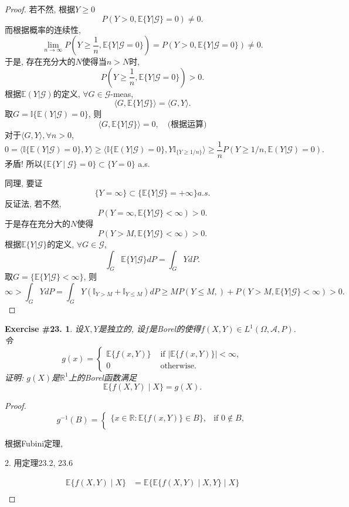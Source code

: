 \documentclass[UTF8, a4paper]{article}
\newtheorem{exercise}{Exercise \#23.}
\begin{document}
\begin{proof}
若不然, 根据\(Y \geq 0\)
$$
P(Y >0, \mathbb{E}\{Y|\mathcal{G}\} = 0) \neq 0.
$$
而根据概率的连续性, 
$$
\lim_{n\to \infty} P\left(Y \geq \frac{1}{n}, \mathbb{E}\{Y|\mathcal{G} = 0\}\right) = P( Y > 0, \mathbb{E}\{Y|\mathcal{G} = 0\}) \neq 0.
$$
于是, 存在充分大的\(N\)使得当\(n > N\)时, 
$$
P\left(Y \geq \frac{1}{n}, \mathbb{E}\{Y|\mathcal{G} = 0\}\right) > 0.
$$
根据\(\mathbb{E}(Y | \mathcal{G})\)的定义, \(\forall G \in\mathcal{G}\)-meas, 
$$
\langle G, \mathbb{E}\{Y|\mathcal{G}\}\rangle = \langle G, Y\rangle.
$$
取\(G = \mathbb{I}\{\mathbb{E}(Y|\mathcal{G}) = 0\}\), 则
$$
\langle G, \mathbb{E}\{Y|\mathcal{G}\}\rangle = 0, \quad \text{(根据运算)}
$$
对于\(\langle G, Y \rangle, \forall n > 0\), 
$$
0 = \langle \mathbb{I}\{\mathbb{E}(Y|\mathcal{G}) = 0\}, Y \rangle \geq \langle \mathbb{I}\{\mathbb{E}(Y|\mathcal{G}) = 0\}, Y \mathbb{I}_{\{Y \geq 1/n\}} \rangle \geq \frac{1}{n} P(Y \geq 1/n, \mathbb{E}(Y|\mathcal{G}) = 0).
$$
矛盾! 所以\(\{\mathbb{E}\{Y \mid \mathcal{G}\} = 0\} \subset \{Y = 0\}\) a.s.


同理, 要证 
$$
\{Y = \infty\} \subset \{\mathbb{E}\{Y|\mathcal{G}\} = + \infty\} a.s.
$$
反证法, 若不然, 
$$
P(Y = \infty, \mathbb{E}\{Y|\mathcal{G}\} <\infty) > 0.
$$
于是存在充分大的\(N\)使得
$$
P(Y > M, \mathbb{E}\{Y|\mathcal{G}\} <\infty) > 0.
$$
根据\(\mathbb{E}\{Y|\mathcal{G}\}\)的定义, \(\forall G \in \mathcal{G}\),
$$
\int_G \mathbb{E}\{Y|\mathcal{G}\} dP = \int_G Y dP.
$$
取\(G = \{\mathbb{E}\{Y|\mathcal{G}\} < \infty\}\), 则
$$
\infty > \int_G YdP = \int_G Y \left(\mathbb{I}_{Y>M} + \mathbb{I}_{Y \leq M}\right) dP \geq M P(Y \leq M, ) + P(Y > M, \mathbb{E}\{Y|\mathcal{G}\} < \infty) > 0.
$$



\end{proof}


\begin{framed}
\begin{exercise}
设\(X, Y\)是独立的, 设\(f\)是Borel的使得\(f(X,Y) \in L^1(\Omega, \mathcal{A}, P)\).
令
$$g(x)=\left\{\begin{array}{cc}\mathbb{E}\{f(x,Y)\}&\text{ if }|\mathbb{E}\{f(x,Y)\}|<\infty,\\0&\text{ otherwise.}\end{array}\right.$$
证明: \(g(X)\)是\(\mathbb{R}^1\)上的Borel函数满足
$$
\mathbb{E}\{f(X, Y) \mid X\} = g(X).
$$
\end{exercise}
\end{framed}

\begin{proof}
$$
g^{-1}(B) = \begin{cases}
\{x \in \mathbb{R}: \mathbb{E}\{f(x, Y)\} \in B\}, & \text{if } 0 \not\in B, \\
\end{cases}
$$

根据Fubini定理, 


2. 用定理23.2, 23.6

$$
\begin{aligned}
\mathbb{E}\{f(X, Y) \mid X\} &= \mathbb{E}\{\mathbb{E}\{f(X, Y) \mid X, Y\} \mid X\} \\
\end{aligned}
$$
\end{proof}
\end{document}
